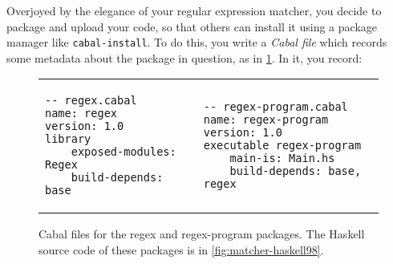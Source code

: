 
Overjoyed by the elegance of your regular expression matcher, you decide
to package and upload your code, so that others can install it
using a package manager like \verb|cabal-install|.  To
do this, you write a \emph{Cabal file} which records some metadata
about the package in question, as in \cref{fig:matcher-packages}.
In it, you record:

\begin{figure}
\begin{tabular}{p{} p{}}
\begin{lstlisting}[language=Cabal]
-- regex.cabal
name: regex
version: 1.0
library
    exposed-modules: Regex
    build-depends: base
\end{lstlisting}
&
\begin{lstlisting}[language=Cabal]
-- regex-program.cabal
name: regex-program
version: 1.0
executable regex-program
    main-is: Main.hs
    build-depends: base, regex
\end{lstlisting}
\end{tabular}
\caption{Cabal files for the regex and regex-program packages. The Haskell source code
of these packages is in \cref{fig:matcher-haskell98}.}
\label{fig:matcher-packages}
\end{figure}

